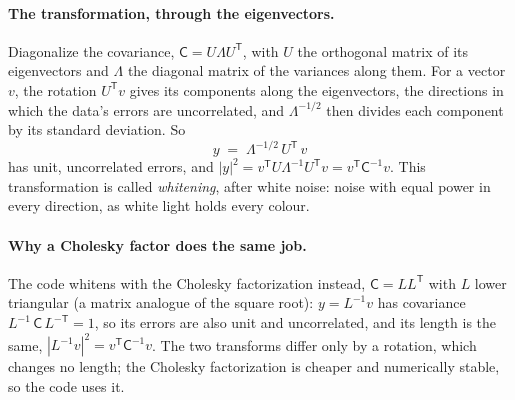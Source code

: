 \documentclass[11pt]{article}
\newcommand{\Cov}{\mathsf{C}}
\newcommand{\T}{^{\mathsf{T}}}
\begin{document}
\paragraph{The transformation, through the eigenvectors.}
Diagonalize the covariance, $\Cov = U\Lambda U\T$, with $U$ the
orthogonal matrix of its eigenvectors and $\Lambda$ the diagonal
matrix of the variances along them.  For a vector $v$, the rotation
$U\T v$ gives its components along the eigenvectors, the directions in
which the data's errors are uncorrelated, and $\Lambda^{-1/2}$ then
divides each component by its standard deviation.  So
\begin{equation}
  y \;=\; \Lambda^{-1/2}\,U\T\,v
  \label{eq:whiteneig}
\end{equation}
has unit, uncorrelated errors, and
$|y|^2 = v\T U \Lambda^{-1} U\T v = v\T\Cov^{-1}v$.  This
transformation is called \emph{whitening}, after white noise: noise
with equal power in every direction, as white light holds every
colour.

\paragraph{Why a Cholesky factor does the same job.}
The code whitens with the Cholesky factorization instead,
$\Cov = LL\T$ with $L$ lower triangular (a matrix analogue of the
square root): $y = L^{-1}v$ has covariance
$L^{-1}\,\Cov\,L^{-\mathsf{T}} = 1$, so its errors are also unit and
uncorrelated, and its length is the same,
$|L^{-1}v|^2 = v\T\Cov^{-1}v$.  The two transforms differ only by a
rotation, which changes no length; the Cholesky factorization is
cheaper and numerically stable, so the code uses it.
\end{document}
